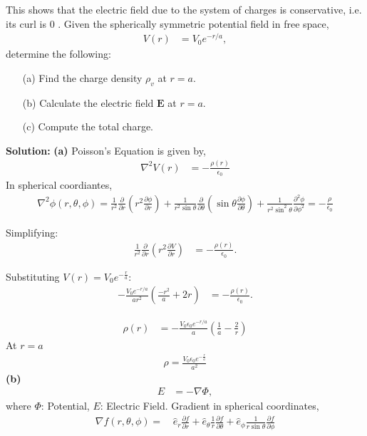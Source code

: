 \documentclass{article}
\begin{document}
This shows that the electric field due to the system of charges is conservative, i.e. its curl is $0$ \newline {}. Given the spherically symmetric potential field in free space, 
\begin{align*}
V(r) &= V_0 e^{-r/a},
\end{align*}
determine the following:

\begin{enumerate}
    \item[(a)] Find the charge density $\rho_v$ at $r = a$.
    \item[(b)] Calculate the electric field $\mathbf{E}$ at $r = a$.
    \item[(c)] Compute the total charge.
\end{enumerate}
\textbf{Solution:}\newline
\textbf{(a)} Poisson's Equation is given by,
\begin{align*}
\nabla^2 V(r) &= -\frac{\rho(r)}{\epsilon_0}
\end{align*}
In spherical coordiantes,
\begin{align*}
\nabla^2 \phi(r, \theta, \phi) = \frac{1}{r^2} \frac{\partial}{\partial r} \left( r^2 \frac{\partial \phi}{\partial r} \right) + \frac{1}{r^2 \sin \theta} \frac{\partial}{\partial \theta} \left( \sin \theta \frac{\partial \phi}{\partial \theta} \right) + \frac{1}{r^2 \sin^2 \theta} \frac{\partial^2 \phi}{\partial \phi^2} = -\frac{\rho}{\epsilon_0}
\end{align*}

Simplifying:
\begin{align*}
\frac{1}{r^2} \frac{\partial}{\partial r} \left( r^2 \frac{\partial V}{\partial r} \right) 
&= -\frac{\rho(r)}{\epsilon_0}.
\end{align*}

Substituting $V(r) = V_0 e^{-\frac{r}{a}} $:
\begin{align*}
-\frac{V_0 e^{-r/a}}{ar^2} \left( \frac{-r^2}{a} + 2r \right) &= -\frac{\rho(r)}{\epsilon_0}.
\end{align*}

\begin{align*}
\rho(r) &= -\frac{V_0 \epsilon_0 e^{-r/a}}{a}\left( \frac{1}{a} - \frac{2}{r} \right)
\end{align*}
At $ r = a $
\begin{align*}
    \rho = \frac{V_0 \epsilon_0e^{-\frac{r}{a}}}{a^2}
\end{align*}
\textbf{(b)}
\begin{align*}
E &= -\nabla \Phi,
\end{align*}
where $ \Phi $: Potential, $ E $: Electric Field. \newline
Gradient in spherical coordinates,
\begin{align*}
\nabla f(r, \theta, \phi) = & \, \hat{e}_r \frac{\partial f}{\partial r}
                            + \hat{e}_\theta \frac{1}{r} \frac{\partial f}{\partial \theta} 
                            + \hat{e}_\phi \frac{1}{r \sin \theta} \frac{\partial f}{\partial \phi}
\end{align*}
\end{document}
